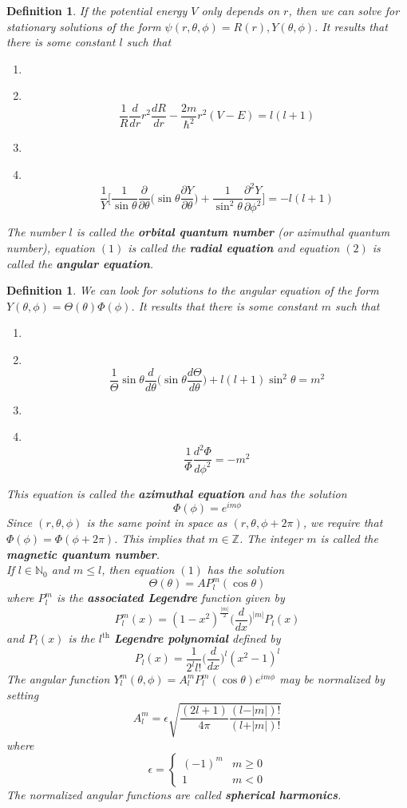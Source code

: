 \documentclass[12pt]{amsart}
\newtheorem{defn}[thm]{Definition}
\newcommand\Item[1][]{%
  \ifx\relax#1\relax  \item \else \item[#1] \fi
  \abovedisplayskip=0pt\abovedisplayshortskip=0pt~\vspace*{-\baselineskip}}
\newcommand{\ep}{\epsilon}
\newcommand{\N}{\mathbb{N}}
\newcommand{\Z}{\mathbb{Z}}
\newcommand{\p}[1]{\frac{\partial}{\partial{#1}}}
\begin{document}
\begin{defn}
If the potential energy $V$ only depends on $r$, then we can solve for stationary solutions of the form $\psi(r, \theta, \phi) = R(r), Y(\theta, \phi)$. It results that there is some constant $l$ such that 

\begin{enumerate}
\Item 
$$\frac{1}{R} \frac{d}{dr} r^2 \frac{dR}{dr} - \frac{2m}{\hbar^2}r^2(V -E) = l(l+1)$$ \vspace{3mm}
\Item 
$$\frac{1}{Y}\bigg[\frac{1}{\sin \theta}\p{\theta} \bigg(\sin \theta \frac{\partial Y}{\partial \theta} \bigg) + \frac{1}{\sin^2 \theta}\frac{\partial^2Y}{\partial \phi^2} \bigg] = -l(l+1)$$

\end{enumerate} \vspace{3mm}
The number $l$ is called the \textbf{orbital quantum number} (or azimuthal quantum number), equation $(1)$ is called the \textbf{radial equation} and equation $(2)$ is called the \textbf{angular equation}. 
\end{defn}

\begin{defn}
We can look for solutions to the angular equation of the form \\$Y(\theta, \phi) = \Theta(\theta)\Phi(\phi)$. It results that there is some constant $m$ such that 
\begin{enumerate}
\Item 
$$\frac{1}{\Theta}  \sin \theta \frac{d}{d\theta}\bigg( \sin \theta \frac{d\Theta}{d\theta} \bigg) + l (l+1) \sin^2 \theta = m^2$$
\vspace{3mm}
\Item $$\frac{1}{\Phi} \frac{d^2 \Phi}{d\phi^2} = -m^2$$
\end{enumerate} \vspace{3mm}
This equation is called the \textbf{azimuthal equation} and has the solution $$\Phi(\phi) = e^{im\phi}$$
Since $(r,\theta, \phi)$ is the same point in space as $(r, \theta, \phi+2 \pi)$, we require that $\Phi(\phi) = \Phi(\phi+2\pi)$. This implies that $m \in \Z$. The integer $m$ is called the \textbf{magnetic quantum number}. \vspace{3mm}\\ 
If $l \in \N_0$ and $m \leq l$, then equation $(1)$ has the solution $$\Theta(\theta) = AP_l^m(\cos \theta)$$ where $P_l^m$ is the \textbf{associated Legendre} function given by $$P_l^m(x) = (1-x^2)^{\frac{\vert m \vert}{2}}\bigg(\frac{d}{dx} \bigg)^{\vert m \vert} P_l(x)$$ and $P_l(x)$ is the $l^{\text{th}}$ \textbf{Legendre polynomial} defined by $$P_l(x) = \frac{1}{2^l l!} \bigg(\frac{d}{dx} \bigg)^{l}(x^2 -1)^l$$ \vspace{3mm} The angular function $Y^m_l(\theta, \phi) = A_l^m P_l^m(\cos \theta)e^{im\phi}$ may be normalized by setting $$A_l^m = \ep \sqrt{\frac{(2l+1)}{4\pi} \frac{(l-\vert m \vert)!}{(l+ \vert m \vert)!}}$$ where $$\ep = 
\begin{cases}
(-1)^m & m \geq 0\\
1 & m < 0
\end{cases}$$ The normalized angular functions are called \textbf{spherical harmonics}.
\end{defn}
\end{document}
